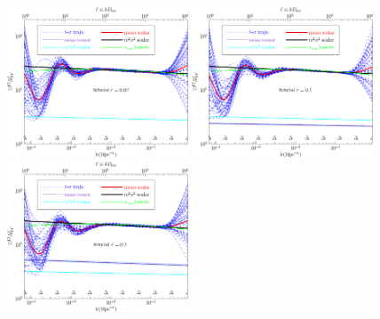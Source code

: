 \documentclass[11pt]{article}
\def \halffigwidth{0.48\textwidth}
\begin{document}
\begin{figure}
  \includegraphics[width=\halffigwidth]{nobicep_spline0_p11_r0d02_power_traj.pdf}%
  \includegraphics[width=\halffigwidth]{nobicep_spline0_p11_r0d1_power_traj.pdf}
  \includegraphics[width=\halffigwidth]{nobicep_spline0_p11_r0d2_power_traj.pdf}%

\end{figure}
\end{document}
